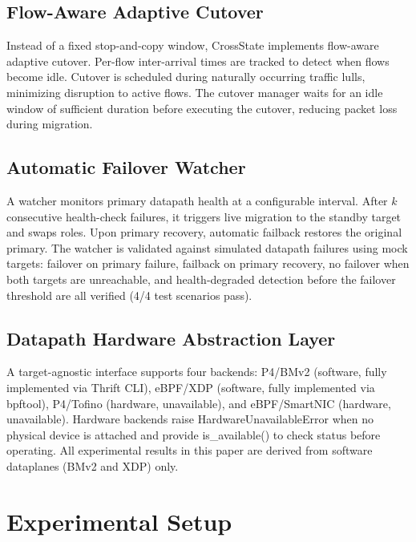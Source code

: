 \documentclass[10pt, conference, compsoc]{IEEEtran}
\begin{document}
\subsection{Flow-Aware Adaptive Cutover}
\label{subsec:adaptive_cutover}
Instead of a fixed stop-and-copy window, CrossState implements flow-aware
adaptive cutover. Per-flow inter-arrival times are tracked to detect when flows
become idle. Cutover is scheduled during naturally occurring traffic lulls,
minimizing disruption to active flows. The cutover manager waits for an idle
window of sufficient duration before executing the cutover, reducing packet loss
during migration.

\subsection{Automatic Failover Watcher}
\label{subsec:failover}
A watcher monitors primary datapath health at a configurable interval. After $k$
consecutive health-check failures, it triggers live migration to the standby
target and swaps roles. Upon primary recovery, automatic failback restores the
original primary. The watcher is validated against simulated datapath failures
using mock targets: failover on primary failure, failback on primary recovery,
no failover when both targets are unreachable, and health-degraded detection
before the failover threshold are all verified (4/4 test scenarios pass).

\subsection{Datapath Hardware Abstraction Layer}
\label{subsec:hal}
A target-agnostic interface supports four backends: P4/BMv2 (software, fully
implemented via Thrift CLI), eBPF/XDP (software, fully implemented via bpftool),
P4/Tofino (hardware, unavailable), and eBPF/SmartNIC (hardware, unavailable).
Hardware backends raise HardwareUnavailableError when no physical device is
attached and provide is\_available() to check status before operating. All
experimental results in this paper are derived from software dataplanes
(BMv2 and XDP) only.

\section{Experimental Setup}
\label{sec:experimental_setup}
\end{document}
